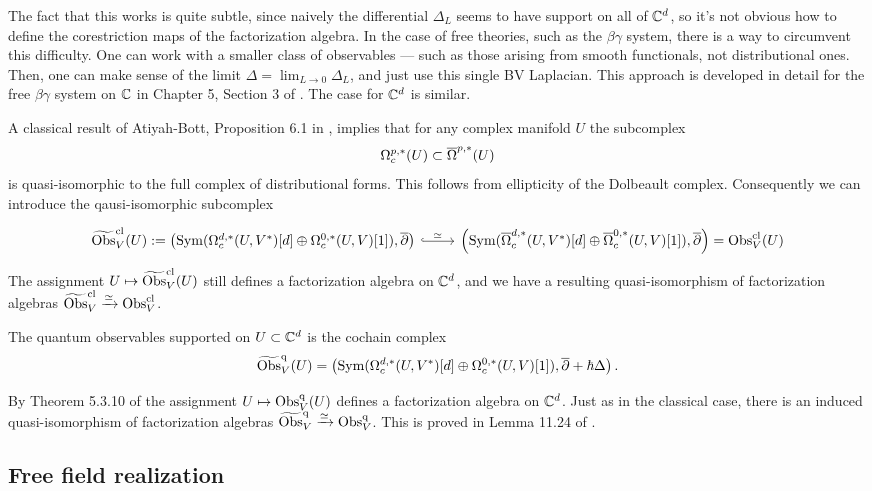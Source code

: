 \documentclass[10pt]{amsart}
\begin{document}
The fact that this works is quite subtle, since naively the differential $\Delta_L$ seems to have support on all of $\CC^d$, so it's not obvious how to define the corestriction maps of the factorization algebra. 
In the case of free theories, such as the $\beta\gamma$ system, there is a way to circumvent this difficulty. 
One can work with a smaller class of observables --- such as those arising from smooth functionals, not distributional ones.
Then, one can make sense of the limit $\Delta = \lim_{L \to 0} \Delta_L$, and just use this single BV Laplacian. 
This approach is developed in detail for the free $\beta\gamma$ system on $\CC$ in Chapter 5, Section 3 of \cite{CG1}. 
The case for $\CC^d$ is similar. 

A classical result of Atiyah-Bott, Proposition 6.1 in \cite{AB}, implies that for any complex manifold $U$ the subcomplex
\[
\Omega^{p,*}_c(U) \subset \Bar{\Omega}^{p,*}(U)
\]
is quasi-isomorphic to the full complex of distributional forms. 
This follows from ellipticity of the Dolbeault complex.
Consequently we can introduce the qausi-isomorphic subcomplex 
\[
\begin{tikzcd}    
\Tilde{\Obs}^{\cl}_V(U) := \left(\Sym(\Omega^{d,*}_c(U,V^*)[d] \oplus \Omega^{0,*}_c(U,V)[1]), \dbar\right) \arrow[hook]{r}{\simeq} & \left(\Sym(\Bar{\Omega}^{d,*}_c(U,V^*)[d] \oplus \Bar{\Omega}^{0,*}_c(U,V)[1]), \dbar \right) = \Obs_V^{\cl}(U)
\end{tikzcd}
\]
The assignment $U \mapsto \Tilde{\Obs}^{\cl}_V(U)$ still defines a factorization algebra on $\CC^d$, and we have a resulting quasi-isomorphism of factorization algebras $\Tilde{\Obs}^{\cl}_V \xto{\simeq} \Obs^{\cl}_V$.


\begin{dfn}
The quantum observables supported on $U \subset \CC^d$ is the cochain complex
\[
\Tilde{\Obs}^\q_V(U) = \left(\Sym(\Omega^{d,*}_c(U,V^*)[d] \oplus \Omega^{0,*}_c(U,V)[1]), \dbar + \hbar \Delta\right) .
\]
\end{dfn}

By Theorem 5.3.10 of \cite{GwThesis} the assignment $U \mapsto \Obs^\q_V(U)$ defines a factorization algebra on $\CC^d$. 
Just as in the classical case, there is an induced quasi-isomorphism of factorization algebras $\Tilde{\Obs}^\q_{V} \xto{\simeq} \Obs^\q_V$. 
This is proved in Lemma 11.24 of \cite{GGW}. 

\subsection{Free field realization}
\end{document}
